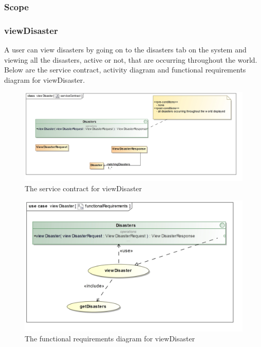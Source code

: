 \subsubsection{Scope}


\subsubsection{viewDisaster}

A user can view disasters by going on to the disasters tab on the system and viewing all the disasters, active or not, that are occurring throughout the world. Below are the service contract, activity diagram and functional requirements diagram for viewDisaster.

\begin{figure}[H]
	\centering
	\includegraphics[scale=0.19]{../images/funcReq/viewDisasterServiceContract.jpg} 
	\caption{The service contract for viewDisaster \label{overflow}}
\end{figure}

\begin{figure}[H]
	\centering
	\includegraphics[width=1.2\textwidth]{../images/funcReq/viewDisasterFunctionalRequirements.jpg}
	\caption{The functional requirements diagram for viewDisaster \label{overflow}}
\end{figure}

